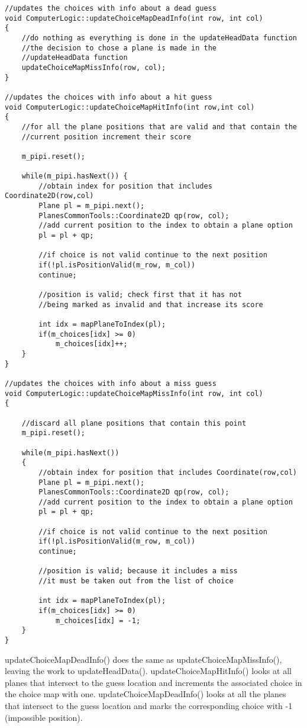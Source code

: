 \begin{lstlisting}
//updates the choices with info about a dead guess
void ComputerLogic::updateChoiceMapDeadInfo(int row, int col)
{
	//do nothing as everything is done in the updateHeadData function
	//the decision to chose a plane is made in the
	//updateHeadData function
	updateChoiceMapMissInfo(row, col);
}

//updates the choices with info about a hit guess
void ComputerLogic::updateChoiceMapHitInfo(int row,int col)
{
	//for all the plane positions that are valid and that contain the
	//current position increment their score
	
	m_pipi.reset();
	
	while(m_pipi.hasNext()) {
		//obtain index for position that includes Coordinate2D(row,col)
		Plane pl = m_pipi.next();
		PlanesCommonTools::Coordinate2D qp(row, col);
		//add current position to the index to obtain a plane option
		pl = pl + qp;
		
		//if choice is not valid continue to the next position
		if(!pl.isPositionValid(m_row, m_col))
		continue;
		
		//position is valid; check first that it has not
		//being marked as invalid and that increase its score
		
		int idx = mapPlaneToIndex(pl);
		if(m_choices[idx] >= 0)
			m_choices[idx]++;
	}
}

//updates the choices with info about a miss guess
void ComputerLogic::updateChoiceMapMissInfo(int row, int col)
{

	//discard all plane positions that contain this point
	m_pipi.reset();
	
	while(m_pipi.hasNext())
	{
		//obtain index for position that includes Coordinate(row,col)
		Plane pl = m_pipi.next();
		PlanesCommonTools::Coordinate2D qp(row, col);
		//add current position to the index to obtain a plane option
		pl = pl + qp;
		
		//if choice is not valid continue to the next position
		if(!pl.isPositionValid(m_row, m_col))
		continue;
		
		//position is valid; because it includes a miss
		//it must be taken out from the list of choice
		
		int idx = mapPlaneToIndex(pl);
		if(m_choices[idx] >= 0)
			m_choices[idx] = -1;
	}
}
\end{lstlisting}

updateChoiceMapDeadInfo() does the same as updateChoiceMapMissInfo(), leaving the work to updateHeadData(). updateChoiceMapHitInfo() looks at all planes that intersect to the guess location and increments the associated choice in the choice map with one. updateChoiceMapDeadInfo() looks at all the planes that intersect to the guess location and marks the corresponding choice with -1 (impossible position).

